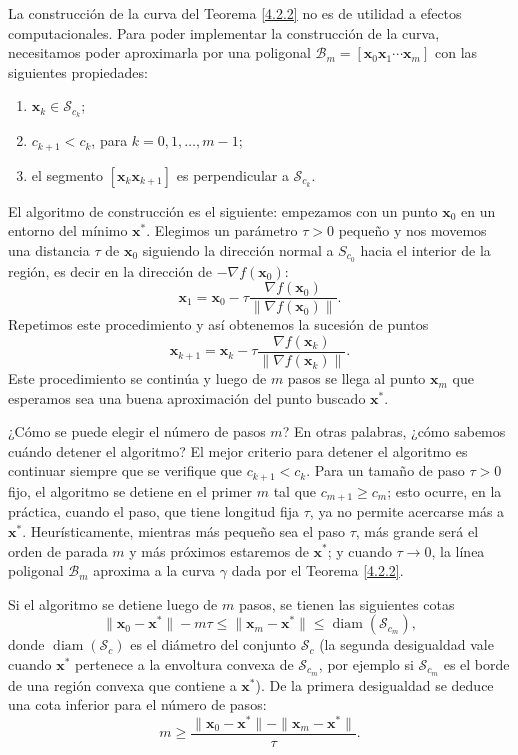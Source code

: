 \documentclass[12pt, a4paper]{amsbook}
\def\diam{\operatorname {\mathrm{diam}}}
\newcommand{\B}{{\mathcal B}}
\newcommand{\Sw}{{\mathcal S}}
\newcommand{\xx}{{\mathbf x}}
\theoremstyle{remark}
\theoremstyle{definition}
\numberwithin{section}{chapter}
\numberwithin{subsection}{section}
\numberwithin{equation}{section}
\numberwithin{figure}{chapter}
\begin{document}
La construcción de la curva del Teorema \ref{4.2.2} no es de utilidad a efectos computacionales. Para poder implementar la construcción de la curva, necesitamos poder aproximarla por una poligonal $\B_m = [\xx_0 \xx_1 \cdots \xx_m]$ con las siguientes propiedades:
\begin{enumerate}
\item $\xx_k\in \Sw_{c_k}$;\label{prop1}
\item $c_{k+1}<c_k$, para $k=0,1,\dots,m-1$;\label{prop2}
\item el segmento $[\xx_k \xx_{k+1}]$ es perpendicular a $\Sw_{c_k}$.\label{prop3}
\end{enumerate}

El algoritmo de construcción es el siguiente: empezamos con un punto $\xx_0$ en un entorno del mínimo $\xx^*$. Elegimos un parámetro $\tau>0$ pequeño y nos movemos una distancia $\tau$ de $\xx_0$ siguiendo la dirección normal a $S_{c_0}$ hacia el interior de la región, es decir  en la dirección de $-\nabla f(\xx_0)$:
$$
\xx_1 = \xx_0 - \tau \frac{\nabla f(\xx_0)}{\|\nabla f(\xx_0)\|}.
$$
Repetimos este procedimiento y así obtenemos la sucesión de puntos
$$
\xx_{k+1} = \xx_k - \tau \frac{\nabla f(\xx_k)}{\|\nabla f(\xx_k)\|}. 
$$
Este procedimiento se continúa y luego de $m$ pasos se llega al punto $\xx_m$ que esperamos sea una buena aproximación del punto buscado $\xx^*$.

¿Cómo se puede elegir el número de pasos $m$? En otras palabras, ¿cómo sabemos cuándo detener el algoritmo? El mejor criterio para detener el algoritmo es continuar siempre que se verifique que $c_{k+1}<c_k$. Para un tamaño de paso $\tau>0$ fijo, el algoritmo se detiene en el primer $m$ tal que $c_{m+1}\ge c_m$; esto ocurre, en la práctica, cuando el paso, que tiene longitud fija $\tau$, ya no permite acercarse más a $\xx^*$. Heurísticamente, mientras más pequeño sea el paso $\tau$, más grande será el orden de parada $m$ y más próximos estaremos de $\xx^*$; y cuando $\tau\to 0$, la línea poligonal $\B_m$ aproxima a la curva $\gamma$ dada por el Teorema \ref{4.2.2}.


Si el algoritmo se detiene luego de $m$ pasos, se tienen las siguientes cotas
\begin{equation}\label{cotas}
\|\xx_0-\xx^*\| - m\tau\le \|\xx_m - \xx^*\|\le \diam(\Sw_{c_m}),
\end{equation}
donde $\diam(\Sw_c)$ es el diámetro del conjunto $\Sw_c$ (la segunda desigualdad vale cuando $\xx^*$ pertenece a la envoltura convexa de $\Sw_{c_m}$, por ejemplo si $\Sw_{c_m}$ es el borde de una región convexa que contiene a $\xx^*$). De la primera desigualdad se deduce una cota inferior para el número de pasos:
$$
m\ge\frac{\|\xx_0-\xx^*\|-\|\xx_m-\xx^*\|}{\tau}.
$$
\end{document}
